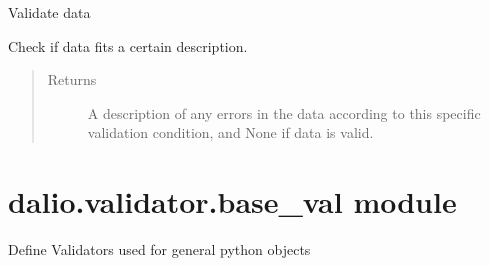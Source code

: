 \documentclass[letterpaper,10pt,english]{sphinxmanual}
\begin{document}
\begin{fulllineitems}
\begin{fulllineitems}
\label{\detokenize{dalio.validator:dalio.validator.array_val.HAS_DIMS.validate}}
Validate data

Check if data fits a certain description.
\begin{quote}\begin{description}
\item[{Returns}] \leavevmode
A description of any errors in the data according to this
specific validation condition, and None if data is valid.

\end{description}\end{quote}

\end{fulllineitems}


\end{fulllineitems}



\section{dalio.validator.base\_val module}
\label{\detokenize{dalio.validator:module-dalio.validator.base_val}}\label{\detokenize{dalio.validator:dalio-validator-base-val-module}}
Define Validators used for general python objects
\end{document}
